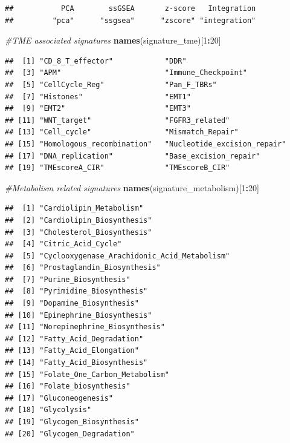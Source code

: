 \documentclass[
  12pt,
]{book}
\newenvironment{Shaded}{\begin{snugshade}}{\end{snugshade}}
\newcommand{\CommentTok}[1]{\textcolor[rgb]{0.56,0.35,0.01}{\textit{#1}}}
\newcommand{\DecValTok}[1]{\textcolor[rgb]{0.00,0.00,0.81}{#1}}
\newcommand{\FunctionTok}[1]{\textcolor[rgb]{0.13,0.29,0.53}{\textbf{#1}}}
\newcommand{\NormalTok}[1]{#1}
\newcommand{\SpecialCharTok}[1]{\textcolor[rgb]{0.81,0.36,0.00}{\textbf{#1}}}
\begin{document}
\begin{verbatim}
##           PCA        ssGSEA       z-score   Integration 
##         "pca"      "ssgsea"      "zscore" "integration"
\end{verbatim}

\begin{Shaded}
\begin{Highlighting}[]
\CommentTok{\#TME associated signatures}
\FunctionTok{names}\NormalTok{(signature\_tme)[}\DecValTok{1}\SpecialCharTok{:}\DecValTok{20}\NormalTok{]}
\end{Highlighting}
\end{Shaded}

\begin{verbatim}
##  [1] "CD_8_T_effector"            "DDR"                       
##  [3] "APM"                        "Immune_Checkpoint"         
##  [5] "CellCycle_Reg"              "Pan_F_TBRs"                
##  [7] "Histones"                   "EMT1"                      
##  [9] "EMT2"                       "EMT3"                      
## [11] "WNT_target"                 "FGFR3_related"             
## [13] "Cell_cycle"                 "Mismatch_Repair"           
## [15] "Homologous_recombination"   "Nucleotide_excision_repair"
## [17] "DNA_replication"            "Base_excision_repair"      
## [19] "TMEscoreA_CIR"              "TMEscoreB_CIR"
\end{verbatim}

\begin{Shaded}
\begin{Highlighting}[]
\CommentTok{\#Metabolism related signatures}
\FunctionTok{names}\NormalTok{(signature\_metabolism)[}\DecValTok{1}\SpecialCharTok{:}\DecValTok{20}\NormalTok{]}
\end{Highlighting}
\end{Shaded}

\begin{verbatim}
##  [1] "Cardiolipin_Metabolism"                    
##  [2] "Cardiolipin_Biosynthesis"                  
##  [3] "Cholesterol_Biosynthesis"                  
##  [4] "Citric_Acid_Cycle"                         
##  [5] "Cyclooxygenase_Arachidonic_Acid_Metabolism"
##  [6] "Prostaglandin_Biosynthesis"                
##  [7] "Purine_Biosynthesis"                       
##  [8] "Pyrimidine_Biosynthesis"                   
##  [9] "Dopamine_Biosynthesis"                     
## [10] "Epinephrine_Biosynthesis"                  
## [11] "Norepinephrine_Biosynthesis"               
## [12] "Fatty_Acid_Degradation"                    
## [13] "Fatty_Acid_Elongation"                     
## [14] "Fatty_Acid_Biosynthesis"                   
## [15] "Folate_One_Carbon_Metabolism"              
## [16] "Folate_biosynthesis"                       
## [17] "Gluconeogenesis"                           
## [18] "Glycolysis"                                
## [19] "Glycogen_Biosynthesis"                     
## [20] "Glycogen_Degradation"
\end{verbatim}
\end{document}
